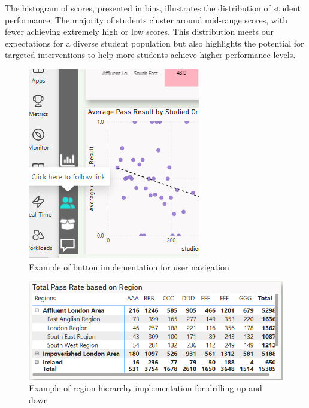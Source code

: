 The histogram of scores, presented in bins, illustrates the distribution of student performance. The majority of students cluster around mid-range scores, with fewer achieving extremely high or low scores. This distribution meets our expectations for a diverse student population but also highlights the potential for targeted interventions to help more students achieve higher performance levels.

\begin{figure}[h]
    \centering
    \includegraphics[width=\linewidth]{photo/buttonim.png}
    \caption{Example of button implementation for user navigation}
    \label{buttonim}
\end{figure}

\begin{figure}[h]
    \centering
    \includegraphics[width=\linewidth]{photo/hierarchy.PNG}
    \caption{Example of region hierarchy implementation for drilling up and down}
    \label{hierar}
\end{figure}

